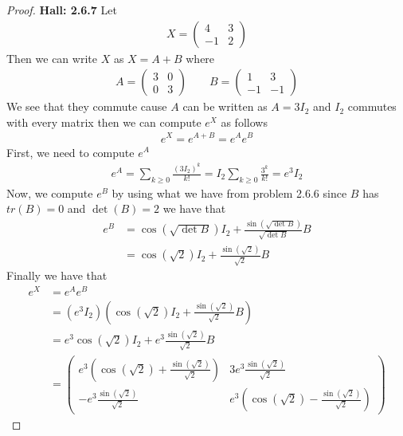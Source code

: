 \documentclass[11pt]{article}
\theoremstyle{definition}
\begin{document}
\begin{proof}{\textbf{Hall: 2.6.7}}
    Let 
    \begin{align*}
        X = \begin{pmatrix} 4 & 3\\ -1 & 2 \end{pmatrix}
    \end{align*}
    Then we can write $X$ as $X = A + B$ where
    \begin{align*}
        A = \begin{pmatrix}
            3 & 0\\ 0 & 3
        \end{pmatrix}
        \qquad
        B = \begin{pmatrix}
            1 & 3\\ -1 & -1
        \end{pmatrix}
    \end{align*}
    We see that they commute cause $A$ can be written as $A = 3I_2$ and $I_2$
    commutes with every matrix then we can compute $e^X$ as follows
    \begin{align*}
        e^X = e^{A + B} = e^{A}e^{B}
    \end{align*}
    First, we need to compute $e^A$
    \begin{align*}
        e^A = \sum_{k \geq 0} \frac{(3I_2)^k}{k!}
        = I_2 \sum_{k \geq 0} \frac{3^k}{k!}
        = e^3 I_2
    \end{align*}
    Now, we compute $e^B$ by using what we have from problem 2.6.6 since $B$
    has $tr(B) = 0$ and $\det(B) = 2$ we have that
    \begin{align*}
        e^B &= \cos(\sqrt{\det{B}})I_2 + \frac{\sin(\sqrt{\det{B}})}{\sqrt{\det{B}}}B\\
        &= \cos(\sqrt{2})I_2 + \frac{\sin(\sqrt{2})}{\sqrt{2}}B
    \end{align*}
    Finally we have that
    \begin{align*}
        e^X &= e^Ae^B\\
        &= (e^3I_2)(\cos(\sqrt{2})I_2 + \frac{\sin(\sqrt{2})}{\sqrt{2}}B)\\
        &= e^3\cos(\sqrt{2})I_2 + e^3\frac{\sin(\sqrt{2})}{\sqrt{2}}B\\
        &= \begin{pmatrix}
            e^3(\cos(\sqrt{2}) + \frac{\sin(\sqrt{2})}{\sqrt{2}})
            & 3e^3\frac{\sin(\sqrt{2})}{\sqrt{2}}\\
            -e^3\frac{\sin(\sqrt{2})}{\sqrt{2}}
            & e^3(\cos(\sqrt{2}) - \frac{\sin(\sqrt{2})}{\sqrt{2}})
        \end{pmatrix}
    \end{align*}
\end{proof}
\end{document}
